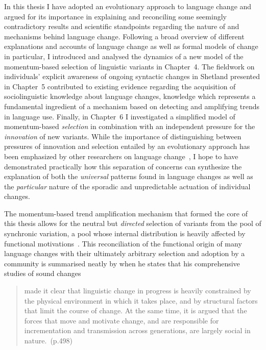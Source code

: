 In this thesis I have adopted an evolutionary approach to language change and argued for its importance in explaining and reconciling some seemingly contradictory results and scientific standpoints regarding the nature of and mechanisms behind language change.
Following a broad overview of different explanations and accounts of language change as well as formal models of change in particular, I introduced and analysed the dynamics of a new model of the momentum-based selection of linguistic variants in Chapter~4. The fieldwork on individuals' explicit awareness of ongoing syntactic changes in Shetland presented in Chapter~5 contributed to existing evidence regarding the acquisition of sociolinguistic knowledge about language changes, knowledge which represents a fundamental ingredient of a mechanism based on detecting and amplifying trends in language use.
Finally, in Chapter~6 I investigated a simplified model of momentum-based \emph{selection} in combination with an independent pressure for the \emph{innovation} of new variants.
While the importance of distinguishing between pressures of innovation and selection entailed by an evolutionary approach has been emphasized by other researchers on language change~\citep[particularly][]{Croft2000},
I hope to have demonstrated practically how this separation of concerns can synthesize the explanation of both the \emph{universal} patterns found in language changes as well as the \emph{particular} nature of the sporadic and unpredictable actuation of individual changes.

The momentum-based trend amplification mechanism that formed the core of this thesis allows for the neutral but \emph{directed} selection of variants from the pool of synchronic variation, a pool whose internal distribution is heavily affected by functional motivations~\citep{Ohala1989}. This reconciliation of the functional origin of many language changes with their ultimately arbitrary selection and adoption by a community is summarised neatly by \citet{Labov2001} when he states that his comprehensive studies of sound changes

\begin{quote}
made it clear that linguistic change in progress is heavily constrained by the physical environment in which it takes place, and by structural factors that limit the course of change. At the same time, it is argued that the forces that move and motivate change, and are responsible for incrementation and transmission across generations, are largely social in nature.~(p.498)
\end{quote}


